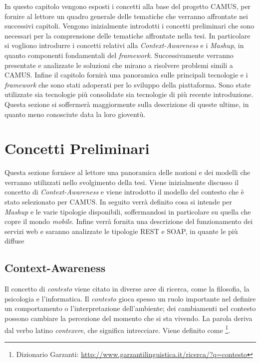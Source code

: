In questo capitolo vengono esposti i concetti alla base del progetto CAMUS, per fornire al lettore un quadro generale delle tematiche che verranno affrontate nei successivi capitoli. Vengono inizialmente introdotti i concetti preliminari che sono necessari per la comprensione delle tematiche affrontate nella tesi. In particolare si vogliono introdurre i concetti relativi alla \emph{Context-Awareness} e i \emph{Mashup}, in quanto componenti fondamentali del \emph{framework}. Successivamente verranno presentate e analizzate le soluzioni che mirano a risolvere problemi simili a CAMUS. Infine il capitolo fornirà una panoramica sulle principali tecnologie e i \emph{framework} che sono stati adoperati per lo sviluppo della piattaforma. Sono state utilizzate sia tecnologie più consolidate sia tecnologie di più recente introduzione. Questa sezione si soffermerà maggiormente sulla descrizione di queste ultime, in quanto meno conosciute data la loro gioventù.

\section{Concetti Preliminari\label{sec:concetti-preliminari}}

Questa sezione fornisce al lettore una panoramica delle nozioni e dei modelli che verranno utilizzati nello svolgimento della tesi. Viene inizialmente discusso il concetto di \emph{Context-Awareness} e viene introdotto il modello del contesto che è stato selezionato per CAMUS. In seguito verrà definito cosa si intende per \emph{Mashup} e le varie tipologie disponibili, soffermandosi in particolare su quella che copre il mondo \emph{mobile}. Infine verrà fornita una descrizione del funzionamento dei servizi web e saranno analizzate le tipologie REST e SOAP, in quante le più diffuse

\subsection{Context-Awareness\label{sec:context-awareness}}

Il concetto di \emph{contesto} viene citato in diverse aree di ricerca, come la filosofia, la psicologia e l'informatica. Il \emph{contesto} gioca spesso un ruolo importante nel definire un comportamento o l'interpretazione dell'ambiente; dei cambiamenti nel contesto possono cambiare la percezione del momento che si sta vivendo. La parola  deriva dal verbo latino \emph{contexere}, che significa intrecciare. Viene definito come \footnote{Dizionario Garzanti: \url{http://www.garzantilinguistica.it/ricerca/?q=contesto}}.

